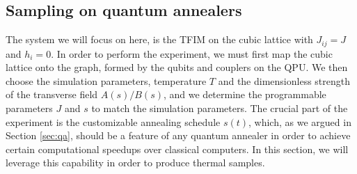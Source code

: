 \documentclass[12pt,a4paper]{article}
\begin{document}
\subsection*{Sampling on quantum annealers} \label{sec:sampling_on_qa}
\hspace*{0.3cm}
The system we will focus on here, is the TFIM on the cubic lattice with $J_{ij} = J$ and $h_i = 0$.
In order to perform the experiment, we must first map the cubic lattice onto the graph,
formed by the qubits and couplers on the QPU. We then choose the simulation parameters, temperature $T$ and
the dimensionless strength of the transverse field $A(s) / B(s)$, and we determine the programmable parameters $J$ and $s$
to match the simulation parameters. The crucial part of the experiment is the customizable annealing schedule $s(t)$,
which, as we argued in Section \ref{sec:qa}, should be a feature of any quantum annealer in order to
achieve certain computational speedups over classical computers. In this section, we will leverage
this capability in order to produce thermal samples.
\end{document}
